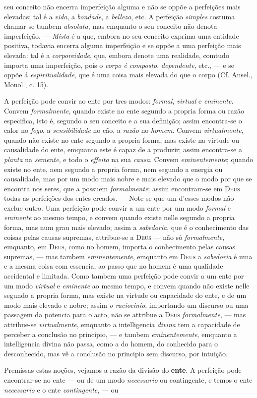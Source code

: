 seu conceito não encerra imperfeição alguma e não se oppõe a perfeições mais elevadas; tal é a \emph{vida}, a \emph{bondade}, a \emph{belleza}, etc. A perfeição \emph{simples} costuma chamar-se tambem \emph{absoluta}, mas emquanto o seu conceito não denota imperfeição. --- \emph{Mista} é a que, embora no seu conceito exprima uma entidade positiva, todavia encerra alguma imperfeição e se oppõe a uma perfeição mais elevada: tal é a \emph{corporeidade}, que, embora denote uma realidade, comtudo importa uma imperfeição, pois o \emph{corpo é composto}, \emph{dependente}, etc., --- e se oppõe á \emph{espiritualidade}, que é uma coisa mais elevada do que o corpo (Cf. Ansel., Monol., c. 15).\par A perfeição pode convir ao ente por tres modos: \emph{formal}, \emph{virtual} e \emph{eminente}. Convem \emph{formalmente}, quando existe no ente segundo a propria forma ou razão especifica, isto é, segundo o seu conceito e a sua definição; assim encontra-se o calor no \emph{fogo}, a \emph{sensibilidade} no cão, a \emph{razão} no \emph{homem}. Convem \emph{virtualmente}, quando não existe no ente segundo a propria forma, mas existe na virtude ou causalidade do ente, emquanto este é capaz de a produzir; assim encontra-se a \emph{planta} na \emph{semente}, e todo o \emph{effeito} na sua \emph{causa}. Convem \emph{eminentemente}; quando existe no ente, nem segundo a propria forma, nem segundo a energia ou causalidade, mas por um modo mais nobre e mais elevado que o modo por que se encontra nos seres, que a possuem \emph{formalmente}; assim encontram-se em \textsc{Deus} todas as perfeições dos entes creados. --- Note-se que um d'esses modos não exclue outro. Uma perfeição pode convir a um ente por um modo \emph{formal} e \emph{eminente} ao mesmo tempo, e convem quando existe nelle segundo a propria forma, mas num grau mais elevado; assim a \emph{sabedoria}, que é o conhecimento das coisas pelas causas supremas, attribue-se a \textsc{Deus} --- não só \emph{formalmente}, emquanto, em \textsc{Deus}, como no homem, importa o conhecimento pelas causas supremas, --- mas tambem \emph{eminentemente}, emquanto em \textsc{Deus} a \emph{sabedoria} é uma e a mesma coisa com essencia, ao passo que no homem é uma qualidade accidental e limitada. Como tambem uma perfeição pode convir a um ente por um modo \emph{virtual} e \emph{eminente} ao mesmo tempo, e convem quando não existe nelle segundo a propria forma, mas existe na virtude ou capacidade do ente, e de um modo mais elevado e nobre; assim \emph{o raciocinio}, importando um discurso ou uma passagem da potencia para o acto, não se attribue a \textsc{Deus} \emph{formalmente}, --- mas attribue-se \emph{virtualmente}, emquanto a intelligencia \emph{divina} tem a capacidade de perceber a conclusão no principio, --- e tambem \emph{eminentemente}, emquanto a intelligencia divina não passa, como a do homem, do conhecido para o desconhecido, mas vê a conclusão no principio sem discurso, por intuição.\par Premissas estas noções, vejamos a razão da divisão do \textbf{ente}. A perfeição pode encontrar-se no ente --- ou de um modo \emph{necessario} ou contingente, e temos o ente \emph{necessario} e o ente \emph{contingente}, --- ou 